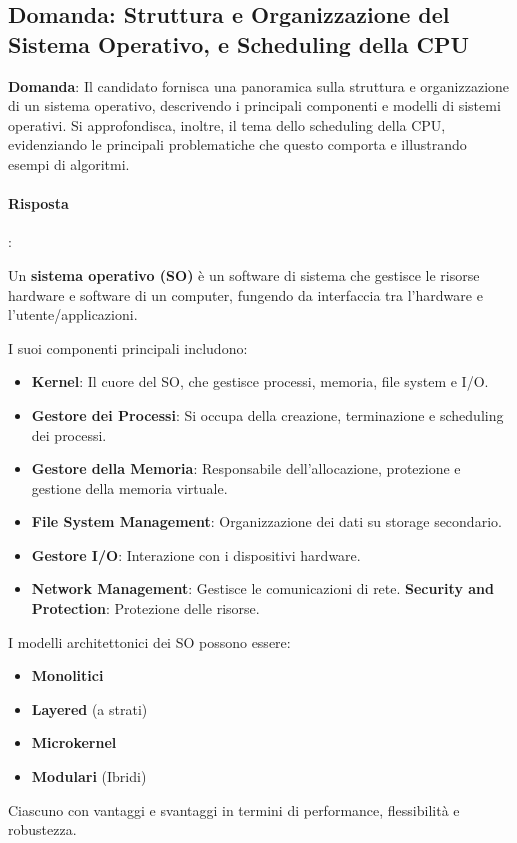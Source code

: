 
\subsection*{Domanda: Struttura e Organizzazione del Sistema Operativo, e Scheduling della CPU} %

\textbf{Domanda}: Il candidato fornisca una panoramica sulla struttura e organizzazione di un sistema operativo, descrivendo i principali componenti e modelli di sistemi operativi. Si approfondisca, inoltre, il tema dello scheduling della CPU, evidenziando le principali problematiche che questo comporta e illustrando esempi di algoritmi.

\paragraph{Risposta}:

Un \textbf{sistema operativo (SO)} è un software di sistema che gestisce le risorse hardware e software di un computer, fungendo da interfaccia tra l'hardware e l'utente/applicazioni.

I suoi componenti principali includono:
\begin{itemize}
    \item \textbf{Kernel}: Il cuore del SO, che gestisce processi, memoria, file system e I/O.
    \item \textbf{Gestore dei Processi}: Si occupa della creazione, terminazione e scheduling dei processi.
    \item \textbf{Gestore della Memoria}: Responsabile dell'allocazione, protezione e gestione della memoria virtuale.
    \item \textbf{File System Management}: Organizzazione dei dati su storage secondario.
    \item \textbf{Gestore I/O}: Interazione con i dispositivi hardware.
    \item \textbf{Network Management}: Gestisce le comunicazioni di rete.
    \textbf{Security and Protection}: Protezione delle risorse.
\end{itemize}
I modelli architettonici dei SO possono essere:
\begin{itemize}
    \item \textbf{Monolitici}
    \item \textbf{Layered} (a strati)
    \item \textbf{Microkernel}
    \item \textbf{Modulari} (Ibridi)
\end{itemize}
Ciascuno con vantaggi e svantaggi in termini di performance, flessibilità e robustezza.

